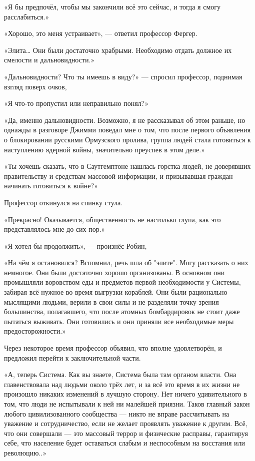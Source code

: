 \documentclass[a4paper,12pt]{book}
\begin{document}
\par
«Я бы предпочёл, чтобы мы закончили всё это сейчас, и тогда я смогу расслабиться.»
\par
«Хорошо, это меня устраивает», — ответил профессор Фергер.
\par
«Элита… Они были достаточно храбрыми. Необходимо отдать должное их смелости и дальновидности.»
\par
«Дальновидности? Что ты имеешь в виду?» — спросил профессор, поднимая взгляд поверх очков,
\par
«Я что-то пропустил или неправильно понял?»
\par
«Да, именно дальновидности. Возможно, я не рассказывал об этом раньше, но однажды в разговоре Джимми поведал мне о том, что после первого объявления о блокировании русскими Ормузского пролива, группа людей стала готовиться к наступлению ядерной войны, значительно преуспев в этом деле.»
\par
«Ты хочешь сказать, что в Саутгемптоне нашлась горстка людей, не доверявших правительству и средствам массовой информации, и призывавшая граждан начинать готовиться к войне?»
\par
Профессор откинулся на спинку стула.
\par
«Прекрасно! Оказывается, общественность не настолько глупа, как это представлялось мне до сих пор.»
\par
«Я хотел бы продолжить», — произнёс Робин,
\par
«На чём я остановился? Вспомнил, речь шла об "элите". Могу рассказать о них немногое. Они были достаточно хорошо организованы. В основном они промышляли воровством еды и предметов первой необходимости у Системы, забирая всё нужное во время выгрузки кораблей. Они были рационально мыслящими людьми, верили в свои силы и не разделяли точку зрения большинства, полагавшего, что после атомных бомбардировок не стоит даже пытаться выживать. Они готовились и они приняли все необходимые меры предосторожности.»\\
\par
Через некоторое время профессор объявил, что вполне удовлетворён, и предложил перейти к заключительной части.
\par
«А, теперь Система. Как вы знаете, Система была там органом власти. Она главенствовала над людьми около трёх лет, и за всё это время в их жизни не произошло никаких изменений в лучшую сторону. Нет ничего удивительного в том, что люди не испытывали к ней ни малейшей приязни. Таков главный закон любого цивилизованного сообщества — никто не вправе рассчитывать на уважение и сотрудничество, если не желает проявлять уважение к другим. Всё, что они совершали — это массовый террор и физические расправы, гарантируя себе, что население будет оставаться слабым и неспособным на восстания или революцию..»\\
\end{document}
